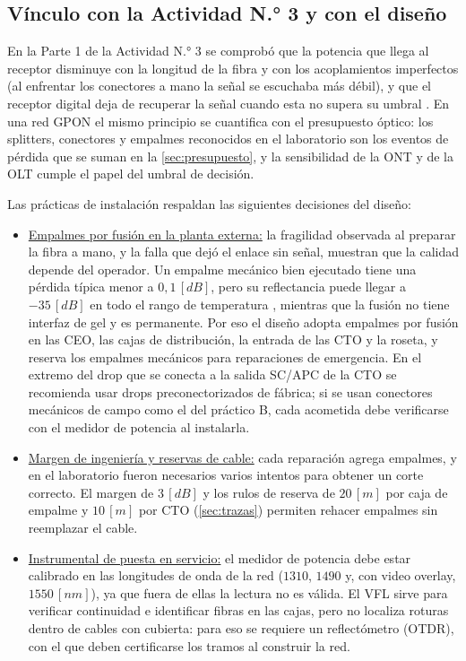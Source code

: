 \subsection{Vínculo con la Actividad N.° 3 y con el diseño}
En la Parte 1 de la Actividad N.° 3 se comprobó que la potencia que llega al receptor disminuye con la longitud de la fibra y con los acoplamientos imperfectos (al enfrentar los conectores a mano la señal se escuchaba más débil), y que el receptor digital deja de recuperar la señal cuando esta no supera su umbral \cite{informe_tp3}. En una red GPON el mismo principio se cuantifica con el presupuesto óptico: los splitters, conectores y empalmes reconocidos en el laboratorio son los eventos de pérdida que se suman en la \autoref{sec:presupuesto}, y la sensibilidad de la ONT y de la OLT cumple el papel del umbral de decisión.

Las prácticas de instalación respaldan las siguientes decisiones del diseño:
\begin{itemize}
    \item \underline{Empalmes por fusión en la planta externa:} la fragilidad observada al preparar la fibra a mano, y la falla que dejó el enlace sin señal, muestran que la calidad depende del operador. Un empalme mecánico bien ejecutado tiene una pérdida típica menor a $0{,}1 \, [dB]$, pero su reflectancia puede llegar a $-35 \, [dB]$ en todo el rango de temperatura \cite{fibrlok}, mientras que la fusión no tiene interfaz de gel y es permanente. Por eso el diseño adopta empalmes por fusión en las CEO, las cajas de distribución, la entrada de las CTO y la roseta, y reserva los empalmes mecánicos para reparaciones de emergencia. En el extremo del drop que se conecta a la salida SC/APC de la CTO se recomienda usar drops preconectorizados de fábrica; si se usan conectores mecánicos de campo como el del práctico B, cada acometida debe verificarse con el medidor de potencia al instalarla.
    \item \underline{Margen de ingeniería y reservas de cable:} cada reparación agrega empalmes, y en el laboratorio fueron necesarios varios intentos para obtener un corte correcto. El margen de $3 \, [dB]$ y los rulos de reserva de $20 \, [m]$ por caja de empalme y $10 \, [m]$ por CTO (\autoref{sec:trazas}) permiten rehacer empalmes sin reemplazar el cable.
    \item \underline{Instrumental de puesta en servicio:} el medidor de potencia debe estar calibrado en las longitudes de onda de la red ($1310$, $1490$ y, con video overlay, $1550 \, [nm]$), ya que fuera de ellas la lectura no es válida. El VFL sirve para verificar continuidad e identificar fibras en las cajas, pero no localiza roturas dentro de cables con cubierta: para eso se requiere un reflectómetro (OTDR), con el que deben certificarse los tramos al construir la red.
\end{itemize}

